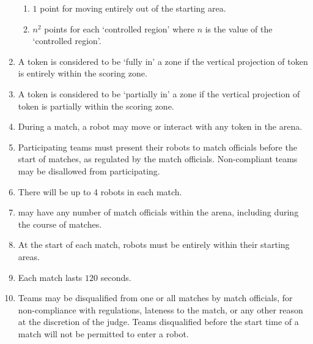\begin{enumerate}
    \begin{enumerate}
      \item $1$ point for moving entirely out of the starting area.
      \item $n^2$ points for each `controlled region' where $n$ is the value of the `controlled region'.
    \end{enumerate}
  \item A token is considered to be `fully in' a zone if the vertical projection of token
        is entirely within the scoring zone.
  \item A token is considered to be `partially in' a zone if the vertical projection of token
        is partially within the scoring zone.
  \item During a match, a robot may move or interact with any token in the arena.
  \item Participating teams must present their robots to match officials before
        the start of matches, as regulated by the match officials. Non-compliant
        teams may be disallowed from participating.
  \item There will be up to 4 robots in each match.
  \item \org may have any number of match officials within the arena, including
        during the course of matches.
  \item At the start of each match, robots must be entirely within their
        starting areas.
  \item Each match lasts $120$ seconds.
  \item Teams may be disqualified from one or all matches by match officials,
        for non-compliance with regulations, lateness to the match, or any other
        reason at the discretion of the judge. Teams disqualified before the
        start time of a match will not be permitted to enter a robot.
\end{enumerate}
